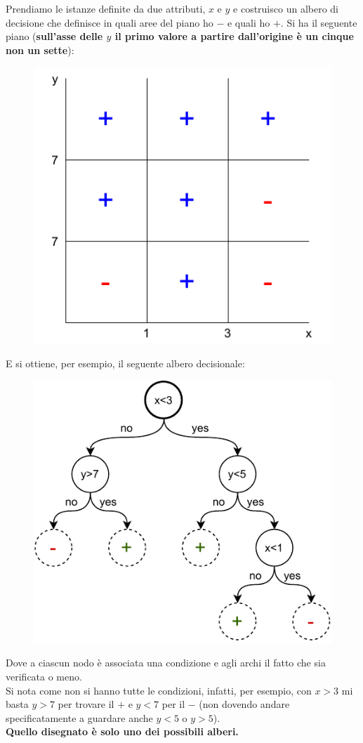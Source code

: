 \begin{esempio}
  Prendiamo le istanze definite da due attributi, $x$ e $y$ e costruisco un
  albero di decisione che definisce in quali aree del piano ho $-$ e quali ho
  $+$.
  \newpage
  Si ha il seguente piano (\textbf{sull'asse delle $y$ il primo valore a partire
  dall'origine è un cinque non un sette}): 
  \begin{figure}[H]
    \centering
    \includegraphics[scale = 0.8]{img/dt3.pdf}
  \end{figure}
  E si ottiene, per esempio, il seguente albero decisionale:
  \begin{figure}[H]
    \centering
    \includegraphics[scale = 0.9]{img/dt4.pdf}
  \end{figure}
  Dove a ciascun nodo è associata una condizione e agli archi il fatto che sia
  verificata o meno.\\
  Si nota come non si hanno tutte le condizioni, infatti, per esempio, con $x>3$
  mi basta $y>7$ per trovare il $+$ e $y<7$ per il $-$ (non dovendo andare
  specificatamente a guardare anche $y<5$ o $y>5$).\\
  \textbf{Quello disegnato è solo uno dei possibili alberi.}
\end{esempio}
